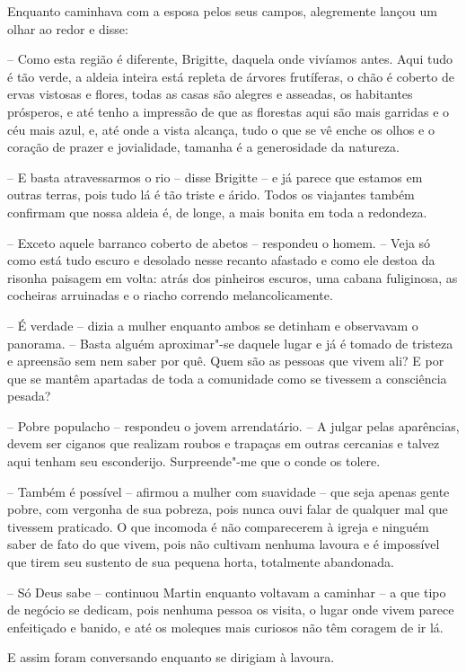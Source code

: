 Enquanto caminhava com a esposa pelos seus campos, alegremente lançou um
olhar ao redor e disse:

-- Como esta região é diferente, Brigitte, daquela onde vivíamos
antes. Aqui tudo é tão verde, a aldeia inteira está repleta de árvores
frutíferas, o chão é coberto de ervas vistosas e flores, todas as casas
são alegres e asseadas, os habitantes prósperos, e até tenho a
impressão de que as florestas aqui são mais garridas e o céu mais azul,
e, até onde a vista alcança, tudo o que se vê enche os olhos e o
coração de prazer e jovialidade, tamanha é a generosidade da natureza.

-- E basta atravessarmos o rio -- disse Brigitte -- e já
parece que estamos em outras terras, pois tudo lá é tão triste e árido.
Todos os viajantes também confirmam que nossa aldeia é, de longe, a
mais bonita em toda a redondeza.

-- Exceto aquele barranco coberto de abetos -- respondeu o
homem. -- Veja só como está tudo escuro e desolado nesse recanto
afastado e como ele destoa da risonha paisagem em volta: atrás dos
pinheiros escuros, uma cabana fuliginosa, as cocheiras arruinadas e o
riacho correndo melancolicamente.

-- É verdade -- dizia a mulher enquanto ambos se detinham e observavam 
o panorama. -- Basta alguém aproximar"-se daquele lugar e já é tomado
de tristeza e apreensão sem nem saber por quê. Quem são as pessoas que
vivem ali? E por que se mantêm apartadas de toda a comunidade como se
tivessem a consciência pesada?

-- Pobre populacho -- respondeu o jovem arrendatário. -- 
A julgar pelas aparências, devem ser ciganos que realizam roubos e
trapaças em outras cercanias e talvez aqui tenham seu esconderijo.
Surpreende"-me que o conde os tolere.

-- Também é possível -- afirmou a mulher com suavidade
-- que seja apenas gente pobre, com vergonha de sua pobreza, pois
nunca ouvi falar de qualquer mal que tivessem praticado. O que incomoda
é não comparecerem à igreja e ninguém saber de fato do que vivem, pois
não cultivam nenhuma lavoura e é impossível que tirem seu sustento de
sua pequena horta, totalmente abandonada.

-- Só Deus sabe -- continuou Martin enquanto voltavam a
caminhar -- a que tipo de negócio se dedicam, pois nenhuma pessoa
os visita, o lugar onde vivem parece enfeitiçado e banido,
e até os moleques mais curiosos não têm coragem de ir lá.

E assim foram conversando enquanto se dirigiam à lavoura. 

